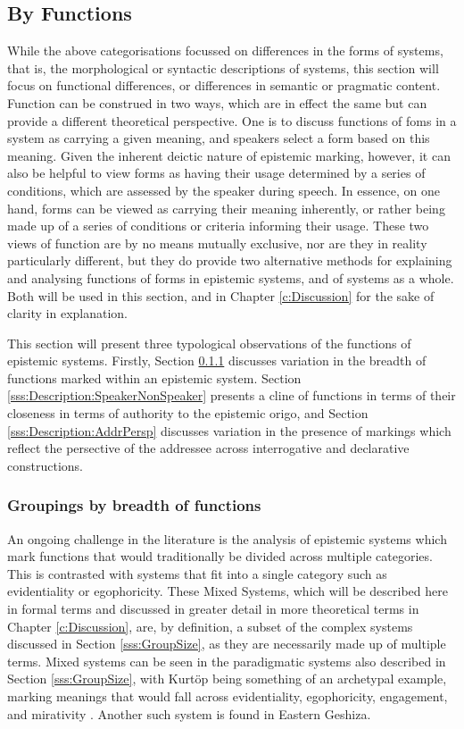 \subsection{By Functions}\label{ss:Description:ClassByFunction}
While the above categorisations focussed on differences in the forms of systems, that is, the morphological or syntactic descriptions of systems, this section will focus on functional differences, or differences in semantic or pragmatic content. Function can be construed in two ways, which are in effect the same but can provide a different theoretical perspective. One is to discuss functions of foms in a system as carrying a given meaning, and speakers select a form based on this meaning. Given the inherent deictic nature of epistemic marking, however, it can also be helpful to view forms as having their usage determined by a series of conditions, which are assessed by the speaker during speech. In essence, on one hand, forms can be viewed as carrying their meaning inherently, or rather being made up of a series of conditions or criteria informing their usage. These two views of function are by no means mutually exclusive, nor are they in reality particularly different, but they do provide two alternative methods for explaining and analysing functions of forms in epistemic systems, and of systems as a whole. Both will be used in this section, and in Chapter \ref{c:Discussion} for the sake of clarity in explanation.

This section will present three typological observations of the functions of epistemic systems. Firstly, Section \ref{sss:Description:MixedSystems} discusses variation in the breadth of functions marked within an epistemic system. Section \ref{sss:Description:SpeakerNonSpeaker} presents a cline of functions in terms of their closeness in terms of authority to the epistemic origo, and Section \ref{sss:Description:AddrPersp} discusses variation in the presence of markings which reflect the persective of the addressee across interrogative and declarative constructions.

\subsubsection{Groupings by breadth of functions}\label{sss:Description:MixedSystems}
An ongoing challenge in the literature is the analysis of epistemic systems which mark functions that would traditionally be divided across multiple categories. This is contrasted with systems that fit into a single category such as evidentiality or egophoricity. These Mixed Systems, which will be described here in formal terms and discussed in greater detail in more theoretical terms in Chapter \ref{c:Discussion}, are, by definition, a subset of the complex systems discussed in Section \ref{sss:GroupSize}, as they are necessarily made up of multiple terms. Mixed systems can be seen in the paradigmatic systems also described in Section \ref{sss:GroupSize}, with Kurtöp being something of an archetypal example, marking meanings that would fall across evidentiality, egophoricity, engagement, and mirativity \cite{Hyslop2020Kurtop}. Another such system is found in Eastern Geshiza. 

